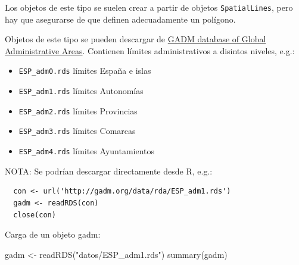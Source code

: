 \documentclass[
  spanish,
]{book}
\newenvironment{Shaded}{\begin{snugshade}}{\end{snugshade}}
\newcommand{\FunctionTok}[1]{\textcolor[rgb]{0.00,0.00,0.00}{#1}}
\newcommand{\NormalTok}[1]{#1}
\newcommand{\OtherTok}[1]{\textcolor[rgb]{0.56,0.35,0.01}{#1}}
\newcommand{\StringTok}[1]{\textcolor[rgb]{0.31,0.60,0.02}{#1}}
\theoremstyle{break}
\theoremstyle{definition}
\theoremstyle{definition}
\theoremstyle{definition}
\theoremstyle{definition}
\theoremstyle{remark}
\begin{document}
Los objetos de este tipo se suelen crear a partir de objetos \texttt{SpatialLines},
pero hay que asegurarse de que definen adecuadamente un polígono.

Objetos de este tipo se pueden descargar de
\href{http://www.gadm.org}{GADM database of Global Administrative Areas}.
Contienen límites administrativos a disintos niveles, e.g.:

\begin{itemize}
\item
  \texttt{ESP\_adm0.rds} límites España e islas
\item
  \texttt{ESP\_adm1.rds} límites Autonomías
\item
  \texttt{ESP\_adm2.rds} límites Provincias
\item
  \texttt{ESP\_adm3.rds} límites Comarcas
\item
  \texttt{ESP\_adm4.rds} límites Ayuntamientos
\end{itemize}

NOTA: Se podrían descargar directamente desde R, e.g.:

\begin{verbatim}
  con <- url('http://gadm.org/data/rda/ESP_adm1.rds')
  gadm <- readRDS(con)
  close(con)
\end{verbatim}

Carga de un objeto gadm:

\begin{Shaded}
\begin{Highlighting}[]
\NormalTok{gadm }\OtherTok{\textless{}{-}} \FunctionTok{readRDS}\NormalTok{(}\StringTok{"datos/ESP\_adm1.rds"}\NormalTok{) }
\FunctionTok{summary}\NormalTok{(gadm)}
\end{Highlighting}
\end{Shaded}
\end{document}
